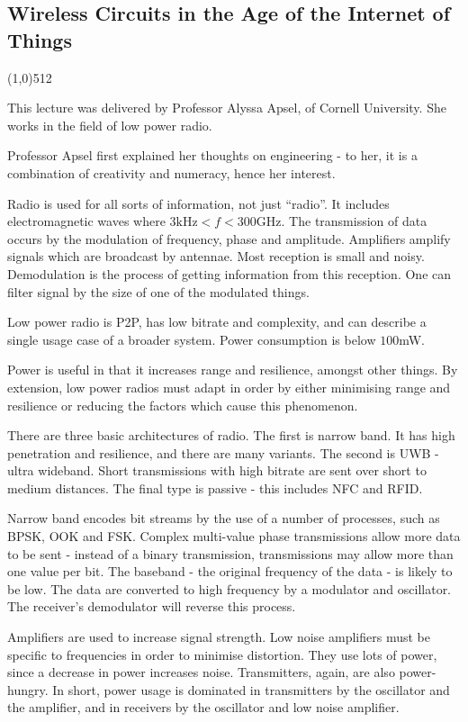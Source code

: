 \documentclass[11pt,a4paper]{report}
\let\origsection\subsection
\renewcommand{\subsection}[1]{\origsection{#1}\vspace{-0.5em}\line(1,0){512}\vspace{-1em}}
\begin{document}
	\subsection{Wireless Circuits in the Age of the Internet of Things}
	\begin{multicols}{2}
		This lecture was delivered by Professor Alyssa Apsel, of Cornell University. She works in the field of low power radio.
		
		Professor Apsel first explained her thoughts on engineering - to her, it is a combination of creativity and numeracy, hence her interest.
		
		Radio is used for all sorts of information, not just ``radio''. It includes electromagnetic waves where \(3\text{kHz} < f < 300\text{GHz}\). The transmission of data occurs by the modulation of frequency, phase and amplitude. Amplifiers amplify signals which are broadcast by antennae. Most reception is small and noisy. Demodulation is the process of getting information from this reception. One can filter signal by the size of one of the modulated things.
		
		Low power radio is P2P, has low bitrate and complexity, and can describe a single usage case of a broader system. Power consumption is below \(100\)mW.
		
		Power is useful in that it increases range and resilience, amongst other things. By extension, low power radios must adapt in order by either minimising range and resilience or reducing the factors which cause this phenomenon.
		
		There are three basic architectures of radio. The first is narrow band. It has high penetration and resilience, and there are many variants. The second is UWB - ultra wideband. Short transmissions with high bitrate are sent over short to medium distances. The final type is passive - this includes NFC and RFID.
		
		Narrow band encodes bit streams by the use of a number of processes, such as BPSK, OOK and FSK. Complex multi-value phase transmissions allow more data to be sent - instead of a binary transmission, transmissions may allow more than one value per bit. The baseband - the original frequency of the data - is likely to be low. The data are converted to high frequency by a modulator and oscillator. The receiver's demodulator will reverse this process.
		
		Amplifiers are used to increase signal strength. Low noise amplifiers must be specific to frequencies in order to minimise distortion. They use lots of power, since a decrease in power increases noise. Transmitters, again, are also power-hungry. In short, power usage is dominated in transmitters by the oscillator and the amplifier, and in receivers by the oscillator and low noise amplifier.
		

\end{multicols}
\end{document}

